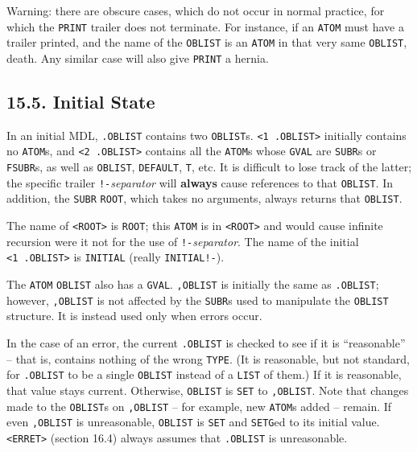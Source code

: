 \documentclass[a4paper,]{article}
\begin{document}
Warning: there are obscure cases, which do not occur in normal practice, for which the \texttt{PRINT} trailer does not
terminate. For instance, if an \texttt{ATOM} must have a trailer printed, and the name of the \texttt{OBLIST} is an
\texttt{ATOM} in that very same \texttt{OBLIST}, death. Any similar case will also give \texttt{PRINT} a hernia.

\subsection{15.5. Initial State}\label{initial-state}

In an initial MDL, \texttt{.OBLIST} contains two \texttt{OBLIST}s.
\texttt{\textless{}1\ .OBLIST\textgreater{}} initially contains no \texttt{ATOM}s, and
\texttt{\textless{}2\ .OBLIST\textgreater{}} contains all the \texttt{ATOM}s whose \texttt{GVAL} are \texttt{SUBR}s or
\texttt{FSUBR}s, as well as \texttt{OBLIST}, \texttt{DEFAULT}, \texttt{T}, etc. It is
difficult to lose track of the latter; the specific trailer \texttt{!-}\emph{separator} will \textbf{always} cause
references to that \texttt{OBLIST}. In addition, the \texttt{SUBR} \texttt{ROOT}, which takes
no arguments, always returns that \texttt{OBLIST}.

The name of \texttt{\textless{}ROOT\textgreater{}} is \texttt{ROOT}; this \texttt{ATOM} is in
\texttt{\textless{}ROOT\textgreater{}} and would cause infinite recursion were it not for the use of
\texttt{!-}\emph{separator}. The name of the initial \texttt{\textless{}1\ .OBLIST\textgreater{}} is
\texttt{INITIAL} (really \texttt{INITIAL!-}).

The \texttt{ATOM} \texttt{OBLIST} also has a \texttt{GVAL}. \texttt{,OBLIST} is initially the same as \texttt{.OBLIST};
however, \texttt{,OBLIST} is not affected by the \texttt{SUBR}s used to manipulate the \texttt{OBLIST} structure. It is
instead used only when errors occur.

In the case of an error, the current \texttt{.OBLIST} is checked to see if it is ``reasonable'' -- that is, contains
nothing of the wrong \texttt{TYPE}. (It is reasonable, but not standard, for \texttt{.OBLIST} to be a single
\texttt{OBLIST} instead of a \texttt{LIST} of them.) If it is reasonable, that value stays current. Otherwise,
\texttt{OBLIST} is \texttt{SET} to \texttt{,OBLIST}. Note that changes made to the \texttt{OBLIST}s on \texttt{,OBLIST} --
for example, new \texttt{ATOM}s added -- remain. If even \texttt{,OBLIST} is unreasonable, \texttt{OBLIST} is \texttt{SET}
and \texttt{SETG}ed to its initial value. \texttt{\textless{}ERRET\textgreater{}} (section 16.4) always assumes that
\texttt{.OBLIST} is unreasonable.
\end{document}
